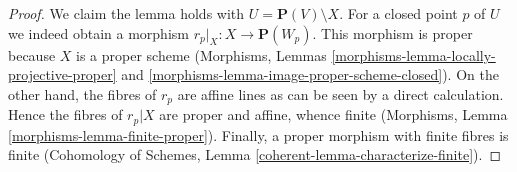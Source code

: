 \documentclass[10pt,a4paper]{amsart}
\theoremstyle{plain}
\theoremstyle{definition}
\theoremstyle{remark}
\numberwithin{equation}{subsection}
\begin{document}
\begin{proof}
We claim the lemma holds with $U = \mathbf{P}(V) \setminus X$. For a closed
point $p$ of $U$ we indeed obtain a morphism $r_p|_X : X \to \mathbf{P}(W_p)$.
This morphism is proper because $X$ is a proper scheme
(Morphisms, Lemmas \ref{morphisms-lemma-locally-projective-proper} and
\ref{morphisms-lemma-image-proper-scheme-closed}). On the other hand, the
fibres of $r_p$ are affine lines as can be seen by a direct calculation.
Hence the fibres of $r_p|X$ are proper and affine, whence finite
(Morphisms, Lemma \ref{morphisms-lemma-finite-proper}).
Finally, a proper morphism with finite fibres is finite
(Cohomology of Schemes, Lemma \ref{coherent-lemma-characterize-finite}).
\end{proof}
\end{document}
